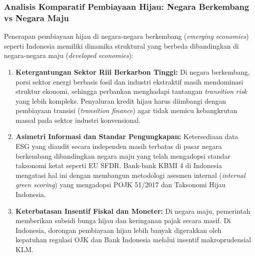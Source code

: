 \documentclass[12pt,a4paper]{article}
\numberwithin{equation}{section}
\begin{document}
\subsubsection{Analisis Komparatif Pembiayaan Hijau: Negara Berkembang vs Negara Maju}
\noindent
Penerapan pembiayaan hijau di negara-negara berkembang (\emph{emerging economies}) seperti Indonesia memiliki dinamika struktural yang berbeda dibandingkan di negara-negara maju (\emph{developed economies}):
\begin{enumerate}
  \item \textbf{Ketergantungan Sektor Riil Berkarbon Tinggi:} Di negara berkembang, porsi sektor energi berbasis fosil dan industri ekstraktif masih mendominasi struktur ekonomi, sehingga perbankan menghadapi tantangan \emph{transition risk} yang lebih kompleks. Penyaluran kredit hijau harus diimbangi dengan pembiayaan transisi (\emph{transition finance}) agar tidak memicu kebangkrutan massal pada sektor industri konvensional.
  \item \textbf{Asimetri Informasi dan Standar Pengungkapan:} Ketersediaan data ESG yang diaudit secara independen masih terbatas di pasar negara berkembang dibandingkan negara maju yang telah mengadopsi standar taksonomi ketat seperti EU SFDR. Bank-bank KBMI 4 di Indonesia mengatasi hal ini dengan membangun metodologi asesmen internal (\emph{internal green scoring}) yang mengadopsi POJK 51/2017 dan Taksonomi Hijau Indonesia.
  \item \textbf{Keterbatasan Insentif Fiskal dan Moneter:} Di negara maju, pemerintah memberikan subsidi bunga hijau dan keringanan pajak secara masif. Di Indonesia, dorongan pembiayaan hijau lebih banyak digerakkan oleh kepatuhan regulasi OJK dan Bank Indonesia melalui insentif makroprudensial KLM.
\end{enumerate}
\end{document}
